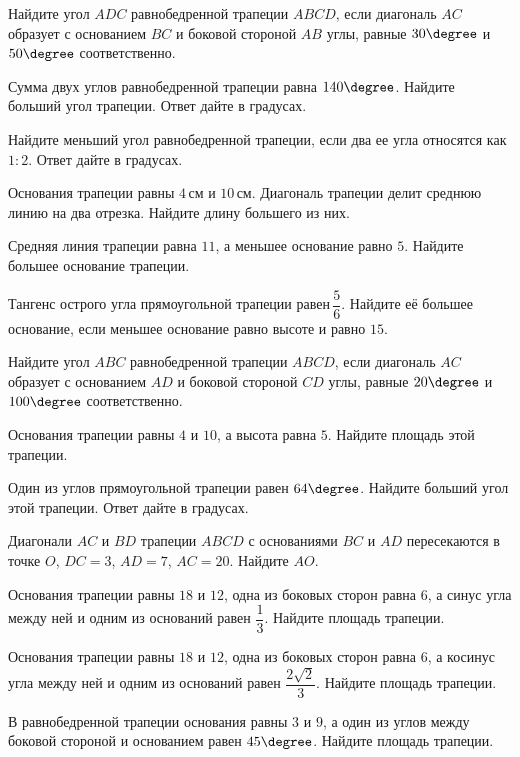\begin{class}[number=4]
	\begin{listofex}
		\item Найдите угол \( ADC \) равнобедренной трапеции \( ABCD \), если диагональ \( AC \) образует с основанием \( BC \) и боковой стороной \( AB \) углы, равные \( 30\degree \) и \( 50\degree \) соответственно.
		\item Сумма двух углов равнобедренной трапеции равна \( 140\degree \). Найдите больший угол трапеции. Ответ дайте в градусах.
		\item Найдите меньший угол равнобедренной трапеции, если два ее угла относятся как \( 1:2 \). Ответ дайте в градусах.
		\item Основания трапеции равны \( 4 \) см и \( 10 \) см. Диагональ трапеции делит среднюю линию на два отрезка. Найдите длину большего из них.
		\item Средняя линия трапеции равна \( 11 \), а меньшее основание равно \( 5 \). Найдите большее основание трапеции.
		\item Тангенс острого угла прямоугольной трапеции равен \( \dfrac{5}{6} \).  Найдите её большее основание, если меньшее основание равно высоте и равно \( 15 \).
		\item Найдите угол \( ABC \) равнобедренной трапеции \( ABCD \), если диагональ \( AC \) образует с основанием \( AD \) и боковой стороной \( CD \) углы, равные \( 20\degree \) и \( 100\degree \) соответственно.
		\item Основания трапеции равны \( 4 \) и \( 10 \), а высота равна \( 5 \). Найдите площадь этой трапеции.
		\item Один из углов прямоугольной трапеции равен \( 64\degree \). Найдите больший угол этой трапеции. Ответ дайте в градусах.
		\item Диагонали \( AC \) и \( BD \) трапеции \( ABCD \) с основаниями \( BC \) и \( AD \) пересекаются в точке \( O \), \( DC=3 \), \( AD=7 \), \( AC=20 \). Найдите \( AO \).
		\item Основания трапеции равны \( 18 \) и \( 12 \), одна из боковых сторон равна \( 6 \), а синус угла между ней и одним из оснований равен \( \dfrac{1}{3} \). Найдите площадь трапеции.
		\item Основания трапеции равны \( 18 \) и \( 12 \), одна из боковых сторон равна \( 6 \), а косинус угла между ней и одним из оснований равен \( \dfrac{2\sqrt{2}}{3} \). Найдите площадь трапеции.
		\item В равнобедренной трапеции основания равны \( 3 \) и \( 9 \), а один из углов между боковой стороной и основанием равен \( 45\degree \). Найдите площадь трапеции.

\end{listofex}
\end{class}
